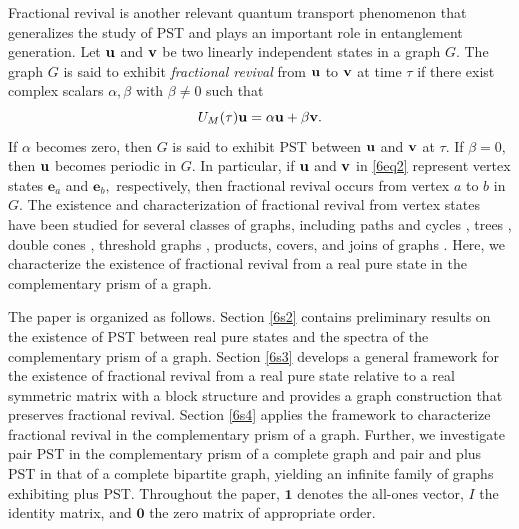 \documentclass[12pt,a4paper]{article}
\def \e {{\bf e}}
\def \u {{\bf u}}
\def \v {{\bf v}}
\def \e {{\mathbf e}}
\begin{document}
Fractional revival is another relevant quantum transport phenomenon that generalizes the study of PST and plays an important role in entanglement generation. 
Let $\u$ and $\v$ be two linearly independent states in a graph $G.$ The graph $G$ is said to exhibit \emph{fractional revival} from $\u$ to $\v$ at time $\tau$ if there exist complex scalars $\alpha,\beta$ with $\beta\neq 0$ such that 
\begin{equation}\label{6eq2}
    U_{M}(\tau)\u=\alpha\u+\beta\v.
\end{equation}
 If $\alpha$ becomes zero, then $G$ is said to exhibit PST between $\u$ and $\v$ at $\tau.$  If $\beta=0,$ then $\u$ becomes periodic in $G.$ In particular, if $\u$ and $\v$ in \eqref{6eq2} represent vertex states $\e_a$ and $\e_b,$ respectively, then fractional revival occurs from vertex $a$ to $b$ in $G.$ The existence and characterization of fractional revival from vertex states have been studied for several classes of graphs, including paths and cycles \cite{chan2}, trees \cite{chan3}, double cones \cite{mon4}, threshold graphs \cite{kirk6}, products, covers, and joins of graphs \cite{cha2}. Here, we characterize the existence of fractional revival from a real pure state in the complementary prism of a graph.

  The paper is organized as follows. Section \ref{6s2} contains preliminary results on the existence of PST between real pure states and the spectra of the complementary prism of a graph.  Section \ref{6s3} develops a general framework for the existence of fractional revival from a real pure state relative to a real symmetric matrix with a block structure and provides a graph construction that preserves fractional revival. Section \ref{6s4} applies the framework to characterize fractional revival in the complementary prism of a graph. Further, we investigate pair PST in the complementary prism of a complete graph and pair and plus PST in that of a complete bipartite graph, yielding an infinite family of graphs exhibiting plus PST.
  Throughout the paper, $\mathbf{1}$ denotes the all-ones vector, $I$ the identity matrix, and $\mathbf{0}$ the zero matrix of appropriate order. 
  
\end{document}
